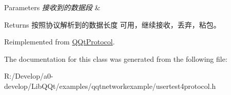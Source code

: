 \begin{DoxyParams}{Parameters}
{\em 接收到的数据段} & \\
\hline
\end{DoxyParams}
\begin{DoxyReturn}{Returns}
按照协议解析到的数据长度 可用，继续接收，丢弃，粘包。 
\end{DoxyReturn}


Reimplemented from \mbox{\hyperlink{class_q_qt_protocol_a00fd0c1ac23379ed3b9b25da9a34f39b}{Q\+Qt\+Protocol}}.



The documentation for this class was generated from the following file\+:\begin{DoxyCompactItemize}
\item 
R\+:/\+Develop/a0-\/develop/\+Lib\+Q\+Qt/examples/qqtnetworkexample/usertest4protocol.\+h\end{DoxyCompactItemize}

